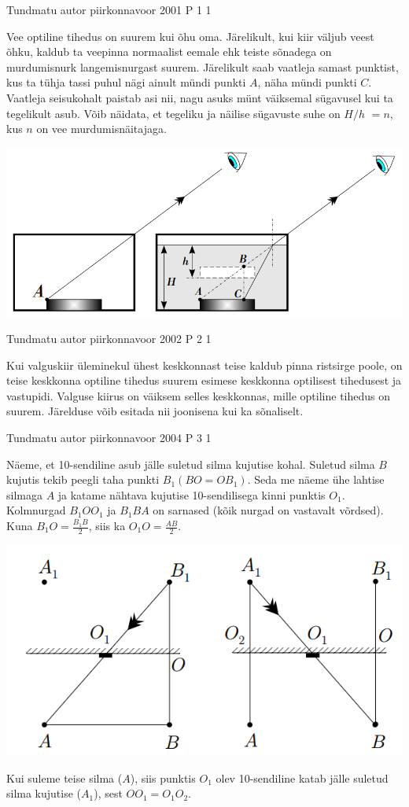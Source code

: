 \documentclass[11pt]{article}
\begin{document}
{%
{Tundmatu autor} %
{piirkonnavoor} %
{2001} %
{P 1} %
{1} %
{

\ifSolution
Vee optiline tihedus on suurem kui õhu oma. Järelikult, kui kiir väljub veest õhku, kaldub ta veepinna normaalist eemale ehk teiste sõnadega on murdumisnurk langemisnurgast suurem. Järelikult saab vaatleja samast punktist, kus ta tühja tassi puhul nägi ainult mündi punkti $A$, näha mündi punkti $C$. Vaatleja seisukohalt paistab asi nii, nagu asuks münt väiksemal sügavusel kui ta tegelikult asub. Võib näidata, et tegeliku ja näilise sügavuste suhe on $H/h$ $ = n$, kus $n$ on vee murdumisnäitajaga.
\begin{center}
	\includegraphics[width=0.5\linewidth]{2001-v2p-01-lah.PNG}
\end{center}
\fi
}

{Tundmatu autor} %
{piirkonnavoor} %
{2002} %
{P 2} %
{1} %
{

\ifSolution
Kui valguskiir üleminekul ühest keskkonnast teise kaldub pinna ristsirge poole, on teise keskkonna optiline tihedus suurem esimese keskkonna optilisest tihedusest ja vastupidi. Valguse kiirus on väiksem selles keskkonnas, mille optiline tihedus on suurem. Järelduse võib esitada nii joonisena kui ka sõnaliselt.
\fi
}
 
 



{Tundmatu autor} %
{piirkonnavoor} %
{2004} %
{P 3} %
{1} %
{

\ifSolution
Näeme, et 10-sendiline asub jälle suletud silma kujutise kohal. Suletud silma $B$ kujutis tekib peegli taha punkti $B_1 (BO = OB_1)$. Seda me näeme ühe lahtise silmaga $A$ ja katame nähtava kujutise 10-sendilisega kinni punktis $O_1$. Kolmnurgad $B_1OO_1$ ja $B_1BA$ on sarnased (kõik nurgad on vastavalt võrdsed). Kuna $B_1O = \frac{B_1B}{2}$, siis ka $O_1O = \frac{AB}{2}$. 
\begin{center}
	\includegraphics[width=0.5\linewidth]{2004-v2p-03-lah.PNG}
\end{center}
Kui suleme teise silma ($A$), siis punktis $O_1$ olev 10-sendiline katab jälle suletud silma kujutise ($A_1$), sest $OO_1 = O_1O_2$.
\fi
}

}
\end{document}
